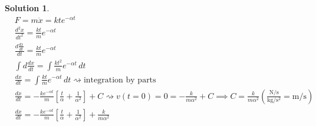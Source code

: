 \documentclass[10pt]{article}
\theoremstyle{definition}
\newtheorem{soln}{Solution}
\begin{document}
\begin{soln} ~\\
      \begin{align*}
             & F = m\ddot{x}=kte^{-\alpha t}                                                                                                                                                                                                                                                                                       \\
             & \frac{d^2x}{dt^2}=\frac{kt}{m}e^{-\alpha t}                                                                                                                                                                                                                                                                         \\
             & \frac{d\frac{dx}{dt}}{dt}=\frac{kt}{m}e^{-\alpha t}                                                                                                                                                                                                                                                                 \\
             & \int d\frac{dx}{dt}=\int \frac{kt^2}{m}e^{-\alpha t} \, dt                                                                                                                                                                                                                                                          \\
             & \frac{dx}{dt}=\int \frac{kt}{m}e^{-\alpha t} \, dt \rightsquigarrow \text{integration by parts}                                                                                                                                                                                                                     \\
             & \frac{dx}{dt}=-\frac{ke^{-\alpha t}}{m}\left[\frac{t}{\alpha}+\frac{1}{\alpha^2}\right]+C \rightsquigarrow v(t=0)=0=-\frac{k}{m\alpha^2}+C\implies C=\frac{k}{m\alpha^2} \left(\frac{\unit{\newton\per\second}}{\unit{\kilo\gram\per\second\squared}}=\unit{\meter\per\second}\right)                               \\
             & \frac{dx}{dt}=-\frac{ke^{-\alpha t}}{m}\left[\frac{t}{\alpha}+\frac{1}{\alpha^2}\right]+\frac{k}{m\alpha^2}                                                                                                                                                                                                         \\

\end{align*}
\end{soln}
\end{document}
